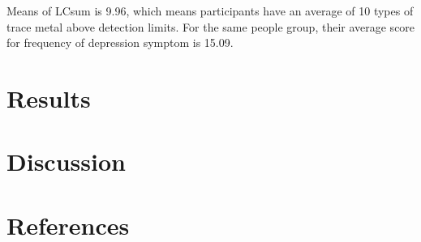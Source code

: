 \documentclass[
  man,floatsintext]{apa6}
\begin{document}
Means of LCsum is 9.96, which means participants have an average of 10 types of trace metal above detection limits. For the same people group, their average score for frequency of depression symptom is 15.09.

\hypertarget{results}{%
\section{Results}\label{results}}

\hypertarget{discussion}{%
\section{Discussion}\label{discussion}}

\newpage

\hypertarget{references}{%
\section{References}\label{references}}
\end{document}
